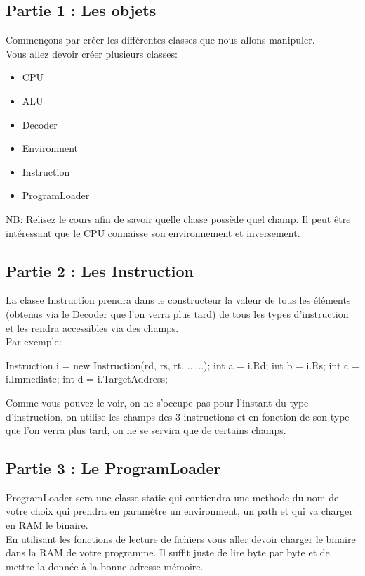 \subsection{Partie 1 : Les objets}
Commençons par créer les différentes classes
que nous allons manipuler.\\ Vous allez devoir créer plusieurs classes:
\begin{itemize}
  \item CPU
  \item ALU
  \item Decoder
  \item Environment
  \item Instruction
  \item ProgramLoader 
\end{itemize} 
NB: Relisez le cours afin de
        savoir quelle classe possède quel champ. Il peut être intéressant que le
        CPU connaisse son environnement et inversement.

\subsection{Partie 2 : Les Instruction} La classe Instruction prendra dans le
constructeur la valeur de tous les éléments (obtenus via le Decoder que l'on
verra plus tard) de tous les types d'instruction et les rendra accessibles via
des champs.\\ Par exemple: 
\begin{code} 
  Instruction i = new Instruction(rd, rs, rt, ......); 
  int a = i.Rd;
  int b = i.Rs;
  int c = i.Immediate;
  int d = i.TargetAddress;
\end{code}
Comme vous pouvez le voir, on ne s'occupe pas pour
l'instant du type d'instruction, on utilise les champs des 3 instructions et en
fonction de son type que l'on verra plus tard, on ne se servira que de certains
champs.

\subsection{Partie 3 : Le ProgramLoader}
ProgramLoader sera une classe static
qui contiendra une methode du nom de votre choix qui prendra en paramètre un
environment, un path et qui va charger en RAM le binaire.\\

En utilisant les fonctions de lecture de fichiers vous aller devoir charger le
binaire dans la RAM de votre programme. Il suffit juste de lire byte par byte et
de mettre la donnée à la bonne adresse mémoire.

